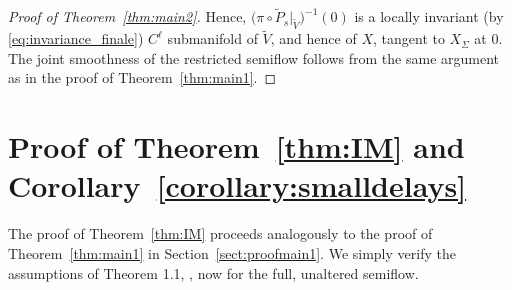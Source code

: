 \documentclass[a4paper, 12pt, oneside, reqno, notitlepage]{amsart}
\theoremstyle{plain}
\theoremstyle{definition}
\theoremstyle{remark}
\begin{document}
\begin{proof}[Proof of Theorem~\ref{thm:main2}]
    Hence, $\big(   \pi \circ \widetilde{P}_s |_{\widetilde{V}}  \big)^{-1}(0)$ is a locally invariant (by \eqref{eq:invariance_finale}) $C^\ell$ submanifold of $\widetilde{V}$, and hence of $X$, tangent to $X_{\Sigma}$ at $0$. 
    The joint smoothness of the restricted semiflow follows from the same argument as in the proof of Theorem~\ref{thm:main1}.
\end{proof}





\section{Proof of Theorem~\ref{thm:IM} and Corollary~\ref{corollary:smalldelays}}
\label{sect:IM}

The proof of Theorem~\ref{thm:IM} proceeds analogously to the proof of Theorem~\ref{thm:main1} in Section~\ref{sect:proofmain1}.
We simply verify the assumptions of Theorem 1.1, \cite{chen1997invariant}, now for the full, unaltered semiflow. 
\end{document}
